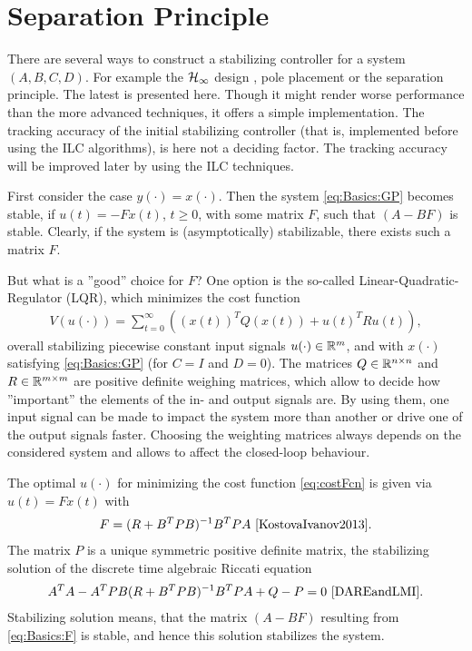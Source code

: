 \section{Separation Principle}
\label{ch:stabilizingController}

There are several ways to construct a stabilizing controller for a system $(A, B, C, D)$. For example the $\mathcal{H}_\infty$ design \cite{discrHinf}, pole placement \cite{LKT} or the separation principle. The latest is presented here. Though it might render worse performance than the more advanced techniques, it offers a simple implementation. The tracking accuracy of the initial stabilizing controller (that is, implemented before using the ILC algorithms), is here not a deciding factor. The tracking accuracy will be improved later by using the ILC techniques. 

First consider the case $y(\cdot) = x(\cdot)$.
Then the system \eqref{eq:Basics:GP} becomes stable, if $u(t) = -Fx(t)$, $t \geq 0$, with some matrix $F$, such that $(A - BF)$ is stable.
Clearly, if the system is (asymptotically) stabilizable, there exists such a matrix $F$. 

But what is a ''good'' choice for $F$? One option is the so-called Linear-Quadratic-Regulator (LQR), which minimizes the cost function 
\begin{align}
\label{eq:costFcn}
V(u(\cdot)) = \sum_{t = 0}^\infty \left( (x(t))^T Q (x(t)) + u(t)^T R u(t)\right),
\end{align}
overall stabilizing piecewise constant input signals $u(\cdot) \in {\mathbb{R}}^m$, and with $x(\cdot)$ satisfying \eqref{eq:Basics:GP} (for $C = I$ and $D = 0$). 
The matrices $Q \in {\mathbb{R}}^{n \times n}$ and $R \in {\mathbb{R}}^{m \times m}$ are positive definite weighing matrices, which allow to decide how ''important'' the elements of the in- and output signals are.  
By using them, one input signal can be made to impact the system more than another or drive one of the output signals faster. 
Choosing the weighting matrices always depends on the considered system and allows to affect the closed-loop behaviour.


The optimal $u(\cdot)$ for minimizing  the cost function \eqref{eq:costFcn} is given via $u(t) = F x(t)$ with
\begin{align}
\label{eq:Basics:F}
F = (R + B^T P B)^{-1}B^TPA \text{ \cite{KostovaIvanov2013}}.
\end{align}
The matrix $P$ is a unique symmetric positive definite matrix, the stabilizing solution of the discrete time algebraic Riccati equation
\begin{align}
 A^TA - A^T P B (R + B^T P B)^{-1} B^T P A + Q - P = 0 \text{ \cite{DAREandLMI}}.
\end{align}
Stabilizing solution means, that the matrix  $(A - BF)$ resulting from \eqref{eq:Basics:F} is stable, and hence this solution stabilizes the system. 


